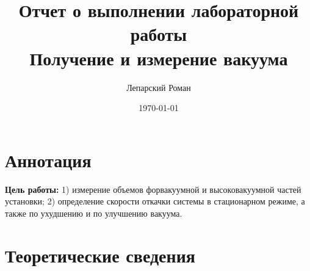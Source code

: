 \documentclass[12pt]{article}
\title{Отчет о выполнении лабораторной работы \\ Получение и измерение вакуума}
\author{Лепарский Роман}
\date{\today}
\begin{document}
\maketitle

\newpage

\section{Аннотация}

\textbf{Цель работы:} 1) измерение объемов форвакуумной и высоковакуумной частей установки; 2) определение скорости откачки системы в стационарном режиме, а также по ухудшению и по улучшению вакуума.

\section{Теоретические сведения}
\end{document}
